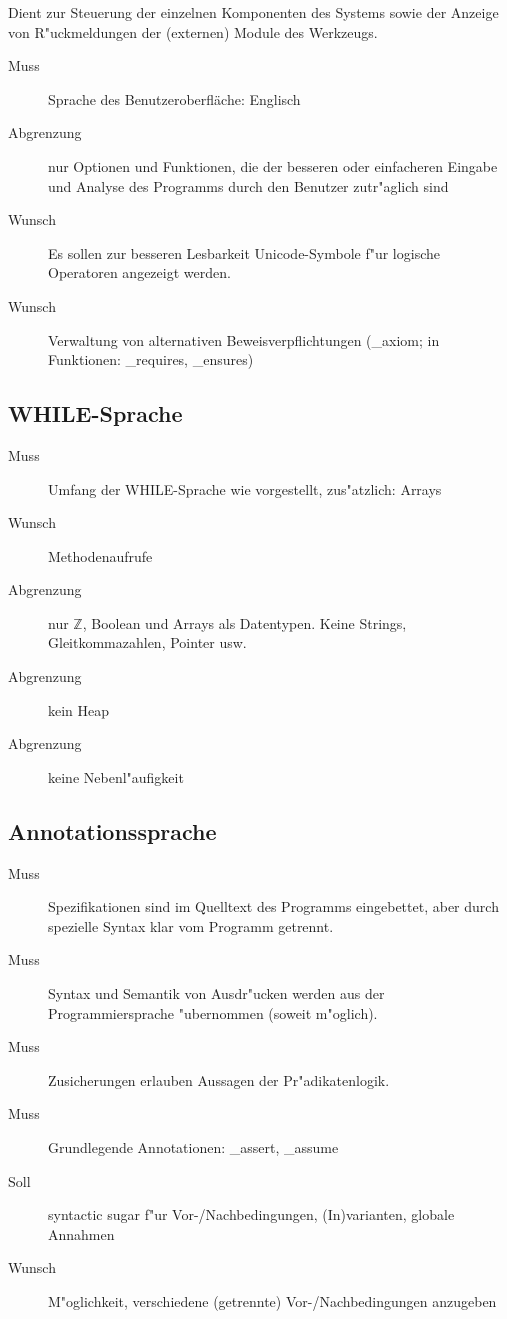 Dient zur Steuerung der einzelnen Komponenten des Systems sowie der Anzeige von R"uckmeldungen der (externen) \siehe Module des Werkzeugs.%

\begin{description}%
    \item [Muss] Sprache des Benutzeroberfläche: Englisch%
    \item [Abgrenzung] nur Optionen und Funktionen, die der besseren oder einfacheren Eingabe und Analyse des Programms durch den Benutzer zutr"aglich sind%
    \item [Wunsch] Es sollen zur besseren Lesbarkeit \siehe Unicode-Symbole f"ur \siehe logische Operatoren angezeigt werden.%
    \item [Wunsch] Verwaltung von alternativen \siehe Beweisverpflichtungen (\_axiom; in Funktionen: \_requires, \_ensures)%
\end{description}%

\subsection{\siehe WHILE-Sprache}%

\begin{description}%
    \item [Muss] Umfang der WHILE-Sprache wie vorgestellt, zus"atzlich: Arrays%
    \item [Wunsch] Methodenaufrufe%
    \item [Abgrenzung] nur $\mathbb{Z}$, Boolean und Arrays als Datentypen. Keine Strings, Gleitkommazahlen, Pointer usw.%
    \item [Abgrenzung] kein \siehe Heap%
    \item [Abgrenzung] keine \siehe Nebenl"aufigkeit%
\end{description}%

\subsection{Annotationssprache}%

\begin{description}%
    \item [Muss] Spezifikationen sind im Quelltext des Programms eingebettet, aber durch spezielle Syntax klar vom Programm getrennt.%
    \item [Muss] Syntax und Semantik von Ausdr"ucken werden aus der Programmiersprache "ubernommen (soweit m"oglich).%
    \item [Muss] Zusicherungen erlauben Aussagen der \siehe Pr"adikatenlogik.%
    \item [Muss] Grundlegende Annotationen: \_assert, \_assume%
    \item [Soll] syntactic sugar f"ur \siehe Vor-/Nachbedingungen, \siehe (In)varianten, \siehe globale Annahmen%
    \item [Wunsch] M"oglichkeit, verschiedene (getrennte) Vor-/Nachbedingungen anzugeben%
\end{description}%

